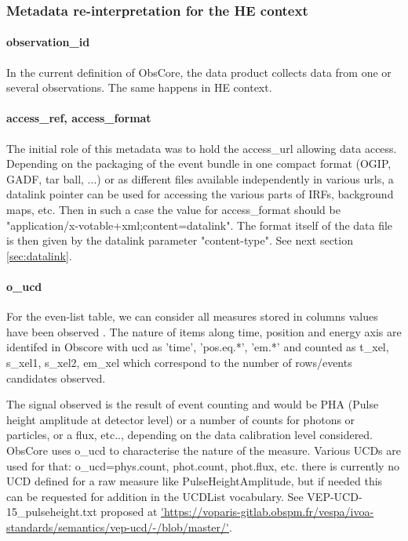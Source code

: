 \documentclass[11pt,a4paper]{ivoa}
\begin{document}
{\subsubsection{Metadata re-interpretation for the HE context}

\paragraph{observation\_id}
In the current definition of ObsCore, the data product collects data from one or several observations. The same happens in \gls{HE} context.

\paragraph{access\_ref, access\_format}
The initial role of this metadata was to hold the access\_url allowing data access.
Depending on the packaging of the event bundle in one compact format (\gls{OGIP}, \gls{GADF}, tar ball, ...)
or as different files available independently in various urls, a datalink pointer can be used for accessing the various parts of \gls{IRF}s, background maps, etc.
Then in such a case the value for access\_format should be "application/x-votable+xml;content=datalink". The format itself of the data file is then given by the datalink parameter "content-type".
See next section \ref{sec:datalink}.

\paragraph{o\_ucd}
For the even-list table, we can consider all measures stored in columns values have been observed .
The nature of items along time, position and energy axis are identifed in Obscore with ucd as 'time', 'pos.eq.*', 'em.*'
and counted as t\_xel, s\_xel1, s\_xel2, em\_xel which correspond to the number of rows/events candidates observed.

The signal observed is the result of event counting and would be PHA (Pulse height amplitude at detector level) or a number of counts for photons or particles, or a flux, etc.., depending on the data calibration level considered.
ObsCore uses o\_ucd to characterise the nature of the measure.
Various UCDs are used for that: o\_ucd=phys.count, phot.count, phot.flux, etc. there is currently no UCD defined for a raw measure like PulseHeightAmplitude, but if needed this can be requested for addition in the UCDList vocabulary. See VEP-UCD-15\_pulseheight.txt proposed at \url{'https://voparis-gitlab.obspm.fr/vespa/ivoa-standards/semantics/vep-ucd/-/blob/master/'}.

}
\end{document}
